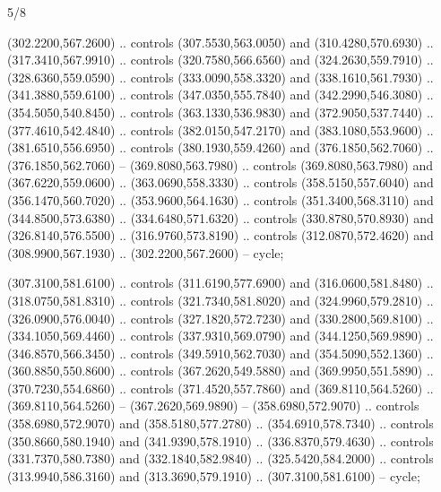 \begin{flagdescription}{5/8}
\begin{scope}[shift={(m)}]
\begin{scope}[scale=\flagwidth/220,y=0.1mm, x=0.1mm, yscale=-1,shift={(-596,-360)}]
\begin{scope}[cm={{-1.0,0.0,0.0,1.0,(1193.9797,0.0)}}]
\begin{scope}[draw=black,line join=round,line cap=round,line width=0.381\lw]
\begin{scope}[line width=0.534\lw,fill=green]
 (302.2200,567.2600) .. controls (307.5530,563.0050) and
  (310.4280,570.6930) .. (317.3410,567.9910) .. controls (320.7580,566.6560) and
  (324.2630,559.7910) .. (328.6360,559.0590) .. controls (333.0090,558.3320) and
  (338.1610,561.7930) .. (341.3880,559.6100) .. controls (347.0350,555.7840) and
  (342.2990,546.3080) .. (354.5050,540.8450) .. controls (363.1330,536.9830) and
  (372.9050,537.7440) .. (377.4610,542.4840) .. controls (382.0150,547.2170) and
  (383.1080,553.9600) .. (381.6510,556.6950) .. controls (380.1930,559.4260) and
  (376.1850,562.7060) .. (376.1850,562.7060) -- (369.8080,563.7980) .. controls
  (369.8080,563.7980) and (367.6220,559.0600) .. (363.0690,558.3330) .. controls
  (358.5150,557.6040) and (356.1470,560.7020) .. (353.9600,564.1630) .. controls
  (351.3400,568.3110) and (344.8500,573.6380) .. (334.6480,571.6320) .. controls
  (330.8780,570.8930) and (326.8140,576.5500) .. (316.9760,573.8190) .. controls
  (312.0870,572.4620) and (308.9900,567.1930) .. (302.2200,567.2600) -- cycle;

 (307.3100,581.6100) .. controls (311.6190,577.6900) and
  (316.0600,581.8480) .. (318.0750,581.8310) .. controls (321.7340,581.8020) and
  (324.9960,579.2810) .. (326.0900,576.0040) .. controls (327.1820,572.7230) and
  (330.2800,569.8100) .. (334.1050,569.4460) .. controls (337.9310,569.0790) and
  (344.1250,569.9890) .. (346.8570,566.3450) .. controls (349.5910,562.7030) and
  (354.5090,552.1360) .. (360.8850,550.8600) .. controls (367.2620,549.5880) and
  (369.9950,551.5890) .. (370.7230,554.6860) .. controls (371.4520,557.7860) and
  (369.8110,564.5260) .. (369.8110,564.5260) -- (367.2620,569.9890) --
  (358.6980,572.9070) .. controls (358.6980,572.9070) and (358.5180,577.2780) ..
  (354.6910,578.7340) .. controls (350.8660,580.1940) and (341.9390,578.1910) ..
  (336.8370,579.4630) .. controls (331.7370,580.7380) and (332.1840,582.9840) ..
  (325.5420,584.2000) .. controls (313.9940,586.3160) and (313.3690,579.1910) ..
  (307.3100,581.6100) -- cycle;


\end{scope}
\end{scope}
\end{scope}
\end{scope}
\end{scope}
\end{flagdescription}
